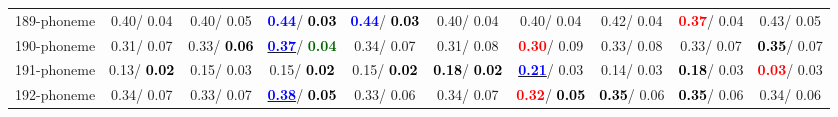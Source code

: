 \begin{table}[h]
\begin{center}
{\begin{tabular}{lc|c|c|c|c|c|c|c|c}
189-phoneme &   0.40/  0.04 &   0.40/  0.05 & \textcolor{blue}{\textbf{  0.44}}/\textcolor{black}{\textbf{  0.03}} & \textcolor{blue}{\textbf{  0.44}}/\textcolor{black}{\textbf{  0.03}} &   0.40/  0.04 &   0.40/  0.04 &   0.42/  0.04 & \textcolor{red}{\textbf{  0.37}}/  0.04 &   0.43/  0.05 \\
190-phoneme &   0.31/  0.07 &   0.33/\textcolor{black}{\textbf{  0.06}} & \underline{\textcolor{blue}{\textbf{  0.37}}}/\textcolor{darkgreen}{\textbf{  0.04}} &   0.34/  0.07 &   0.31/  0.08 & \textcolor{red}{\textbf{  0.30}}/  0.09 &   0.33/  0.08 &   0.33/  0.07 & \textcolor{black}{\textbf{  0.35}}/  0.07 \\
191-phoneme &   0.13/\textcolor{black}{\textbf{  0.02}} &   0.15/  0.03 &   0.15/\textcolor{black}{\textbf{  0.02}} &   0.15/\textcolor{black}{\textbf{  0.02}} & \textcolor{black}{\textbf{  0.18}}/\textcolor{black}{\textbf{  0.02}} & \underline{\textcolor{blue}{\textbf{  0.21}}}/  0.03 &   0.14/  0.03 & \textcolor{black}{\textbf{  0.18}}/  0.03 & \textcolor{red}{\textbf{  0.03}}/  0.03 \\
192-phoneme &   0.34/  0.07 &   0.33/  0.07 & \underline{\textcolor{blue}{\textbf{  0.38}}}/\textcolor{black}{\textbf{  0.05}} &   0.33/  0.06 &   0.34/  0.07 & \textcolor{red}{\textbf{  0.32}}/\textcolor{black}{\textbf{  0.05}} & \textcolor{black}{\textbf{  0.35}}/  0.06 & \textcolor{black}{\textbf{  0.35}}/  0.06 &   0.34/  0.06 \\\end{tabular}}\label{stratsALCKappa5AllReduxalla}
\end{center}
\end{table}
